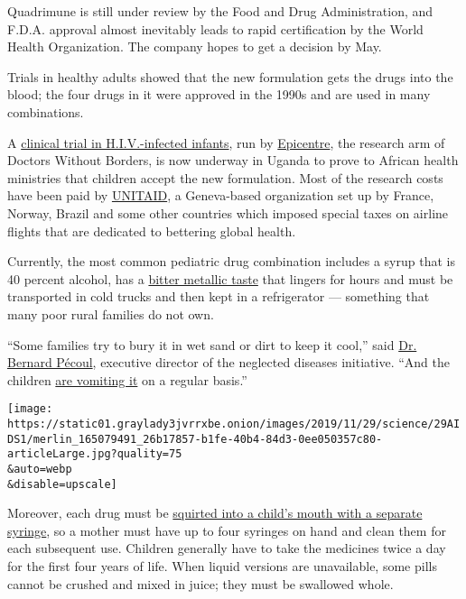 Quadrimune is still under review by the Food and Drug Administration,
and F.D.A. approval almost inevitably leads to rapid certification by
the World Health Organization. The company hopes to get a decision by
May.

Trials in healthy adults showed that the new formulation gets the drugs
into the blood; the four drugs in it were approved in the 1990s and are
used in many combinations.

A
\href{https://www.dndi.org/2019/media-centre/news-views-stories/news/study-for-a-child-friendly-hiv-treatment-begins-in-uganda/}{clinical
trial in H.I.V.-infected infants}, run by
\href{https://epicentre.msf.org/en/acceuil}{Epicentre}, the research arm
of Doctors Without Borders, is now underway in Uganda to prove to
African health ministries that children accept the new formulation. Most
of the research costs have been paid by
\href{https://unitaid.org/\#en}{UNITAID}, a Geneva-based organization
set up by​ France, Norway, Brazil and some other countries ​which
imposed special taxes on airline flights that are dedicated to
​bettering​ global health.

Currently, the most common pediatric drug combination includes a syrup
that is 40 percent alcohol, has a
\href{https://www.accessdata.fda.gov/drugsatfda_docs/label/2012/020945s034lbl.pdf}{bitter
metallic taste} that lingers for hours and must be transported in cold
trucks and then kept in a refrigerator --- something that many poor
rural families do not own.

``Some families try to bury it in wet sand or dirt to keep it cool,''
said
\href{https://www.dndi.org/about-dndi/our-people/leadership/bernard-pecoul/}{Dr.
Bernard Pécoul}, executive director of the neglected diseases
initiative. ``And the children
\href{https://www.youtube.com/watch?v=Lbo2zL9JfG8}{are vomiting it} on a
regular basis.''

\texttt{[image: https://static01.graylady3jvrrxbe.onion/images/2019/11/29/science/29AIDS1/merlin\_165079491\_26b17857-b1fe-40b4-84d3-0ee050357c80-articleLarge.jpg?quality=75\\\&auto=webp\\\&disable=upscale]}

Moreover, each drug must be
\href{https://www.youtube.com/watch?v=1pJNJaxZnNs\&feature=emb_title}{squirted
into a child's mouth with a separate syringe}, so a mother must have up
to four syringes on hand and clean them for each subsequent use.
Children generally have to take the medicines twice a day for the first
four years of life. When liquid versions are unavailable, some pills
cannot be crushed and mixed in juice; they must be swallowed whole.

